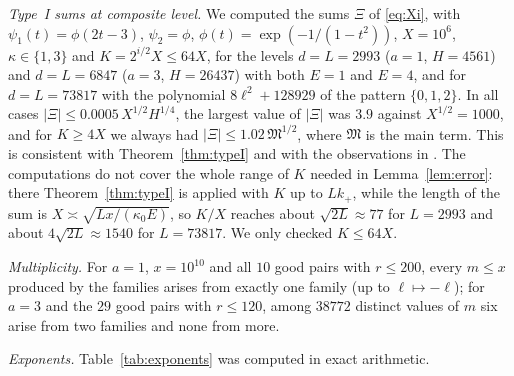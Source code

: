 \documentclass[11pt]{amsart}
\theoremstyle{remark}
\theoremstyle{definition}
\numberwithin{equation}{section}
\begin{document}
\emph{Type~I sums at composite level.} We computed the sums $\Xi$ of \eqref{eq:Xi}, with $\psi_1(t)=\phi(2t-3)$, $\psi_2=\phi$, $\phi(t)=\exp(-1/(1-t^2))$, $X=10^6$, $\kappa\in\{1,3\}$ and $K=2^{i/2}X\le64X$, for the levels $d=L=2993$ ($a=1$, $H=4561$) and $d=L=6847$ ($a=3$, $H=26437$) with both $E=1$ and $E=4$, and for $d=L=73817$ with the polynomial $8\ell^2+128929$ of the pattern $\{0,1,2\}$. In all cases $|\Xi|\le0.0005\,X^{1/2}H^{1/4}$, the largest value of $|\Xi|$ was $3.9$ against $X^{1/2}=1000$, and for $K\ge4X$ we always had $|\Xi|\le1.02\,\mathfrak M^{1/2}$, where $\mathfrak M$ is the main term. This is consistent with Theorem~\ref{thm:typeI} and with the observations in \cite[\S14]{IC}. The computations do not cover the whole range of $K$ needed in Lemma~\ref{lem:error}: there Theorem~\ref{thm:typeI} is applied with $K$ up to $Lk_+$, while the length of the sum is $X\asymp\sqrt{Lx/(\kappa_0E)}$, so $K/X$ reaches about $\sqrt{2L}\approx77$ for $L=2993$ and about $4\sqrt{2L}\approx1540$ for $L=73817$. We only checked $K\le64X$.

\emph{Multiplicity.} For $a=1$, $x=10^{10}$ and all $10$ good pairs with $r\le200$, every $m\le x$ produced by the families arises from exactly one family (up to $\ell\mapsto-\ell$); for $a=3$ and the $29$ good pairs with $r\le120$, among $38772$ distinct values of $m$ six arise from two families and none from more.

\emph{Exponents.} Table~\ref{tab:exponents} was computed in exact arithmetic.
\end{document}
